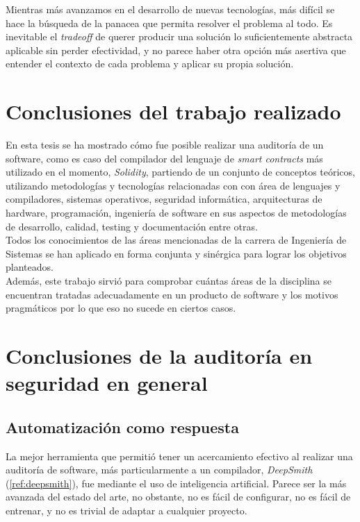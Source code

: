 Mientras más avanzamos en el desarrollo de nuevas tecnologías, más difícil se hace la búsqueda de la panacea que permita resolver el problema al todo. Es inevitable el \textit{tradeoff} de querer producir una solución lo suficientemente abstracta aplicable sin perder efectividad, y no parece haber otra opción más asertiva que entender el contexto de cada problema y aplicar su propia solución.

\section{Conclusiones del trabajo realizado} 
En esta tesis se ha mostrado cómo fue posible realizar una auditoría de un software, como es caso del compilador del lenguaje de \textit{smart contracts} más utilizado en el momento, \textit{Solidity}, partiendo de un conjunto de conceptos teóricos, utilizando metodologías y tecnologías relacionadas con con área de lenguajes y compiladores, sistemas operativos, seguridad informática, arquitecturas de hardware, programación, ingeniería de software en sus aspectos de metodologías de desarrollo, calidad, testing y documentación entre otras.\\

Todos los conocimientos de las áreas mencionadas de la carrera de Ingeniería de Sistemas se han aplicado en forma conjunta y sinérgica para lograr los objetivos planteados.\\

Además, este trabajo sirvió para comprobar cuántas áreas de la disciplina se encuentran tratadas adecuadamente en un producto de software y los motivos pragmáticos por lo que eso no sucede en ciertos casos.\\

\section{Conclusiones de la auditoría en seguridad en general}

\subsection{Automatización como respuesta}
La mejor herramienta que permitió tener un acercamiento efectivo al realizar una auditoría de software, más particularmente a un compilador, \textit{DeepSmith} (\ref{ref:deepsmith}), fue mediante el uso de inteligencia artificial. Parece ser la más avanzada del estado del arte, no obstante, no es fácil de configurar, no es fácil de entrenar, y no es trivial de adaptar a cualquier proyecto.\\

